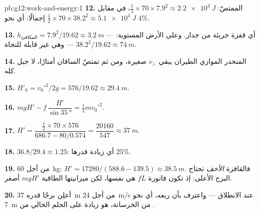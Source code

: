 \begin{solution}{pb:g12:work-and-energy:1}
\textbf{12.} الممتصّ: $\tfrac12 \times 70 \times 7.9^2 \approx
\qty{2.2e3}{J}$، في مقابل $\tfrac12 \times 70 \times 38.2^2 \approx
\qty{5.1e4}{J}$ إجمالًا: أي نحو $4\%$.

\textbf{13.} $h_{\text{المكافئ}} = 7.9^2/19.62 \approx \qty{3.2}{m}$ ---
أي قفزة جريئة من جدار. وعلى الأرض المستوية: $38.2^2/19.62 \approx \qty{74}{m}$ ---
وهي غير قابلة للنجاة.

\textbf{14.} المنحدر الموازي  الطيران يبقي $v_\perp$
صغيرة، ومن ثم تمتصّ الساقان أمتارًا، لا جبل 
كله.

\textbf{15.} $H'_0 = v_0'^2/2g = 576/19.62 \approx \qty{29.4}{m}$.

\textbf{16.} $mgH' - f\,\dfrac{H'}{\sin\qty{35}{\degree}} =
\tfrac12 m v_0'^2$.

\textbf{17.} $H' = \dfrac{\tfrac12 \times 70 \times 576}
{686.7 - 80/0.574} = \dfrac{\num{20160}}{547} \approx \qty{37}{m}$.

\textbf{18.} $36.8/29.4 \approx 1.25$: أي زيادة قدرها $25\%$.

\textbf{19.} من أجل \qty{60}{kg}: $H' = \num{17280}/(588.6 - 139.5)
\approx \qty{38.5}{m}$. فالقافزة \emph{الأخف} تحتاج البرج
الأعلى: إذ تكون فاتورة  $fL$ هي نفسها، لكن ميزانيتها الطاقية
$mgH'$ أصغر.

\textbf{20.} أعلِن برجًا قدره \qty{37}{m} من أجل \qty{24}{m/s} عند
الانطلاق --- واعترف بأن ربعه، أي نحو \qty{7}{m} من
الخرسانة، هو زيادة  على الحلم الخالي من .
\end{solution}
